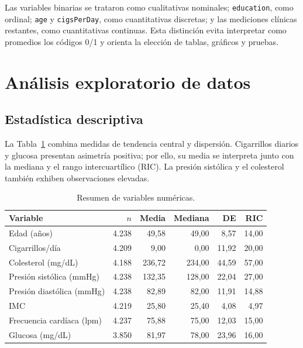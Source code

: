 \documentclass[10pt,a4paper]{article}
\begin{document}
Las variables binarias se trataron como cualitativas nominales; \texttt{education}, como ordinal; \texttt{age} y \texttt{cigsPerDay}, como cuantitativas discretas; y las mediciones clínicas restantes, como cuantitativas continuas. Esta distinción evita interpretar como promedios los códigos 0/1 y orienta la elección de tablas, gráficos y pruebas.

\section{Análisis exploratorio de datos}

\subsection{Estadística descriptiva}

La Tabla~\ref{tab:descriptiva} combina medidas de tendencia central y dispersión. Cigarrillos diarios y glucosa presentan asimetría positiva; por ello, su media se interpreta junto con la mediana y el rango intercuartílico (RIC). La presión sistólica y el colesterol también exhiben observaciones elevadas.

\begin{table}[H]
\centering
\caption{Resumen de variables numéricas.}
\label{tab:descriptiva}
\small
\begin{tabular}{lrrrrr}
\toprule
\textbf{Variable} & \textbf{$n$} & \textbf{Media} & \textbf{Mediana} & \textbf{DE} & \textbf{RIC} \\
\midrule
Edad (años) & 4.238 & 49,58 & 49,00 & 8,57 & 14,00 \\
Cigarrillos/día & 4.209 & 9,00 & 0,00 & 11,92 & 20,00 \\
Colesterol (mg/dL) & 4.188 & 236,72 & 234,00 & 44,59 & 57,00 \\
Presión sistólica (mmHg) & 4.238 & 132,35 & 128,00 & 22,04 & 27,00 \\
Presión diastólica (mmHg) & 4.238 & 82,89 & 82,00 & 11,91 & 14,88 \\
IMC & 4.219 & 25,80 & 25,40 & 4,08 & 4,97 \\
Frecuencia cardíaca (lpm) & 4.237 & 75,88 & 75,00 & 12,03 & 15,00 \\
Glucosa (mg/dL) & 3.850 & 81,97 & 78,00 & 23,96 & 16,00 \\
\bottomrule
\end{tabular}
\end{table}
\end{document}
